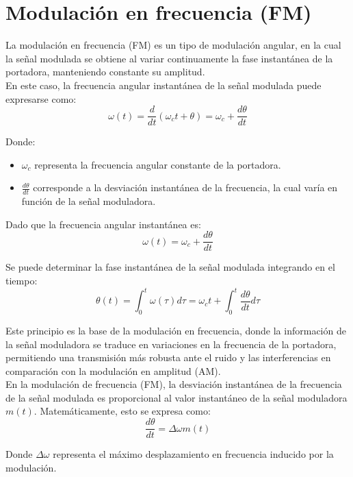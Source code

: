 \section{Modulación en frecuencia (FM)}

La modulación en frecuencia (FM) es un tipo de modulación angular, en la cual la señal modulada se obtiene al variar continuamente la fase instantánea de la portadora, manteniendo constante su amplitud.\\

En este caso, la frecuencia angular instantánea de la señal modulada puede expresarse como:
\begin{equation}
\omega(t) = \frac{d}{dt} (\omega_c t + \theta) = \omega_c + \frac{d\theta}{dt}
\end{equation}

Donde:
\begin{itemize}
\item \( \omega_c \) representa la frecuencia angular constante de la portadora.
\item \( \frac{d\theta}{dt} \) corresponde a la desviación instantánea de la frecuencia, la cual varía en función de la señal moduladora.\\
\end{itemize}

Dado que la frecuencia angular instantánea es:
\[
\omega(t) = \omega_c + \frac{d\theta}{dt}
\]

Se puede determinar la fase instantánea de la señal modulada integrando en el tiempo:
\[
\theta(t) = \int_0^t \omega(\tau) d\tau = \omega_c t + \int_0^t \frac{d\theta}{dt} d\tau
\]

Este principio es la base de la modulación en frecuencia, donde la información de la señal moduladora se traduce en variaciones en la frecuencia de la portadora, permitiendo una transmisión más robusta ante el ruido y las interferencias en comparación con la modulación en amplitud (AM).\\

En la modulación de frecuencia (FM), la desviación instantánea de la frecuencia de la señal modulada es proporcional al valor instantáneo de la señal moduladora \( m(t) \). Matemáticamente, esto se expresa como:
\begin{equation}
\frac{d\theta}{dt} = \Delta\omega m(t)
\end{equation}

Donde \( \Delta\omega \) representa el máximo desplazamiento en frecuencia inducido por la modulación.

